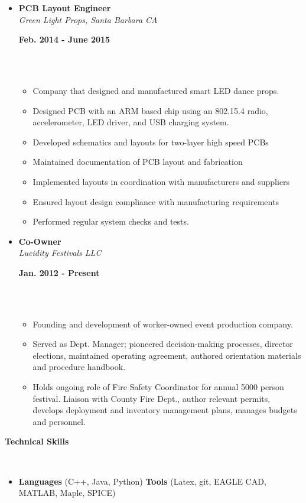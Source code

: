 \documentclass[a4paper,11pt]{article}
\newcommand{\isep}{-2 pt}
\newcommand{\lsep}{-0.2cm}
\newcommand{\resheading}[1]{{\small \colorbox{mygrey}{\begin{minipage}{0.975\textwidth}{\textbf{#1 \vphantom{p\^{E}}}}\end{minipage}}}}
\newcommand{\workexp}[4]{
\begin{minipage}[t]{7cm}
\begin{flushleft}
\textbf{#1} \\
\indent \emph{#2}\\
\end{flushleft}
\end{minipage}
\hfill
\begin{minipage}[t]{7cm}
\begin{flushright}
\textbf{#3} \\
\indent #4 \\
\end{flushright}
\end{minipage}
}
\begin{document}
\begin{itemize}
\item
\workexp{PCB Layout Engineer}{Green Light Props, Santa Barbara CA}{Feb. 2014 - June 2015}{}
\\[-0.3cm]
	\begin{itemize}\itemsep \isep
	\item Company that designed and manufactured smart LED dance props.
	\item Designed PCB with an ARM based chip using an 802.15.4 radio, accelerometer, LED driver, and USB charging system.
	\item Developed schematics and layouts for two-layer high speed PCBs
	\item Maintained documentation of PCB layout and fabrication
	\item Implemented layouts in coordination with manufacturers and suppliers
	\item Ensured layout design compliance with manufacturing requirements
	\item Performed regular system checks and tests.
	\end{itemize}
\item
\workexp{Co-Owner}{Lucidity Festivals LLC}{Jan. 2012 - Present}{}
\\[-0.3cm]
	\begin{itemize}\itemsep \isep
	\item Founding and development of worker-owned event production company.
	\item Served as Dept. Manager; pioneered decision-making processes, director elections, maintained operating agreement, authored orientation materials and procedure handbook.
	\item Holds ongoing role of Fire Safety Coordinator for annual 5000 person festival. Liaison with County Fire Dept., author relevant permits, develops deployment and inventory management plans, manages budgets and personnel.
	\end{itemize}
\end{itemize}


\resheading{\textbf{Technical Skills} }\\[\lsep]
\begin{itemize}
\item \noindent \textbf{Languages} (C++, Java, Python)  
\textbf{Tools} (Latex, git, EAGLE CAD, MATLAB, Maple, SPICE) 
\end{itemize} 
\end{document}
